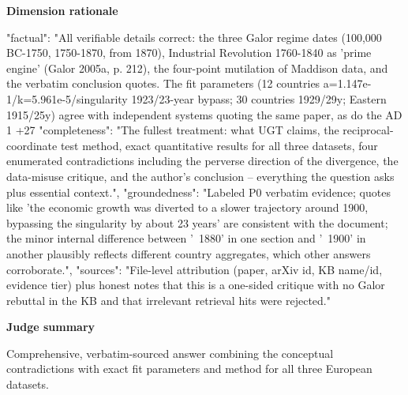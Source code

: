 \documentclass[10pt]{article}
\begin{document}
\textbf{Dimension rationale}
\begin{EvidenceText}
{
  "factual": "All verifiable details correct: the three Galor regime dates (100,000 BC-1750, 1750-1870, from 1870), Industrial Revolution 1760-1840 as 'prime engine' (Galor 2005a, p. 212), the four-point mutilation of Maddison data, and the verbatim conclusion quotes. The fit parameters (12 countries a=1.147e-1/k=5.961e-5/singularity 1923/23-year bypass; 30 countries 1929/29y; Eastern 1915/25y) agree with independent systems quoting the same paper, as do the AD 1 +27%
  "completeness": "The fullest treatment: what UGT claims, the reciprocal-coordinate test method, exact quantitative results for all three datasets, four enumerated contradictions including the perverse direction of the divergence, the data-misuse critique, and the author's conclusion -- everything the question asks plus essential context.",
  "groundedness": "Labeled P0 verbatim evidence; quotes like 'the economic growth was diverted to a slower trajectory around 1900, bypassing the singularity by about 23 years' are consistent with the document; the minor internal difference between '~1880' in one section and '~1900' in another plausibly reflects different country aggregates, which other answers corroborate.",
  "sources": "File-level attribution (paper, arXiv id, KB name/id, evidence tier) plus honest notes that this is a one-sided critique with no Galor rebuttal in the KB and that irrelevant retrieval hits were rejected."
}
\end{EvidenceText}

\textbf{Judge summary}
\begin{EvidenceText}
Comprehensive, verbatim-sourced answer combining the conceptual contradictions with exact fit parameters and method for all three European datasets.
\end{EvidenceText}
\end{document}
